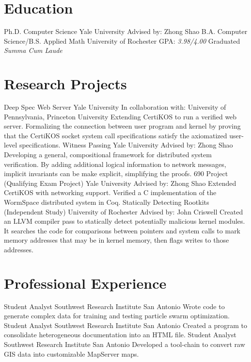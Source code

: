 \documentclass[10pt, letterpaper, sans]{moderncv}
\begin{document}
\renewcommand*{\namefont}{\fontsize{20}{24}\mdseries\upshape}
\makecvtitle
\vspace{-1cm}

\section{Education}
        {Ph.D. Computer Science}
        {Yale University}
        {}
        {}
        {Advised by: Zhong Shao}
        {B.A. Computer Science/B.S. Applied Math}
        {University of Rochester}
        {} %
        {GPA: \textit{3.98/4.00}}
        {Graduated \textit{Summa Cum Laude}}

\section{Research Projects}
        {Deep Spec Web Server}
        {Yale University}
        {In collaboration with: University of Pennsylvania, Princeton University}
        {}
        {Extending CertiKOS to run a verified web server.
         Formalizing the connection between user program and kernel by proving that
         the CertiKOS socket system call specifications satisfy the axiomatized
         user-level specifications.}
        {Witness Passing}
        {Yale University}
        {Advised by: Zhong Shao}
        {}
        {Developing a general, compositional framework for distributed system verification.
         By adding additional logical information to network messages, implicit invariants
         can be make explicit, simplifying the proofs.}
        {690 Project (Qualifying Exam Project)}
        {Yale University}
        {Advised by: Zhong Shao}
        {}
        {Extended CertiKOS with networking support.
         Verified a C implementation of the WormSpace distributed system in Coq.}
        {Statically Detecting Rootkits (Independent Study)}
        {University of Rochester}
        {Advised by: John Criswell}
        {}
        {Created an LLVM compiler pass to statically detect potentially malicious kernel modules.
         It searches the code for comparisons between pointers and system calls to mark
         memory addresses that may be in kernel memory, then flags writes to those
         addresses.}

\section{Professional Experience}
        {Student Analyst}
        {Southwest Research Institute}
        {San Antonio}
        {}
        {Wrote code to generate complex data for training and testing particle swarm optimization.}
        {Student Analyst}
        {Southwest Research Institute}
        {San Antonio}
        {}
        {Created a program to consolidate heterogeneous documentation into an HTML file.}
        {Student Analyst}
        {Southwest Research Institute}
        {San Antonio}
        {}
        {Developed a tool-chain to convert raw GIS data into customizable MapServer maps.}
\end{document}
